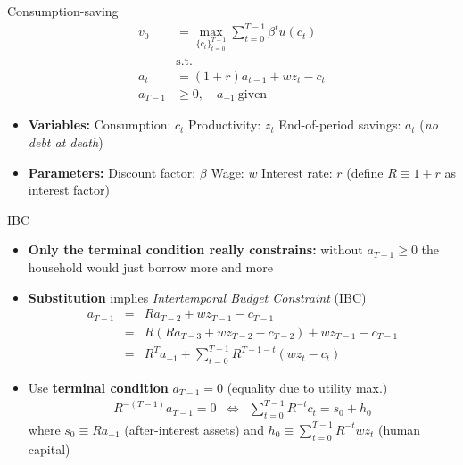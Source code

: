 \documentclass[
  10pt,
  ignorenonframetext,
  aspectratio=43,
  english,
  handout]{beamer}
\providecommand{\tightlist}{%
  \setlength{\itemsep}{0pt}\setlength{\parskip}{0pt}}
\begin{document}
\begin{frame}{Consumption-saving}
\protect{}\label{consumption-saving}
\[
\begin{aligned}
v_{0} & =\max_{\{c_{t}\}^{T-1}_{t=0}}\sum^{T-1}_{t=0}\beta^{t}u(c_{t})\\
& \text{s.t.}\\
a_{t} & =(1+r)a_{t-1}+wz_{t}-c_{t}\\
a_{T-1} & \geq0, \quad a_{-1}\  \text{given}
\end{aligned}
\]

\begin{itemize}
\item
  \textbf{Variables:} Consumption: \(c_{t}\) Productivity: \(z_{t}\)
  End-of-period savings: \(a_{t}\) (\emph{no debt at death})
\item
  \textbf{Parameters:} Discount factor: \(\beta\) Wage: \(w\) Interest
  rate: \(r\) (define \(R\equiv1+r\) as interest factor)
\end{itemize}
\end{frame}

\begin{frame}{IBC}
\protect{}\label{ibc}
\begin{itemize}
\tightlist
\item
  \textbf{Only the terminal condition really constrains:} without
  \(a_{T-1}\geq0\) the household would just borrow more and more
\item
  \textbf{Substitution} implies \emph{Intertemporal Budget Constraint}
  (IBC) \[
    \begin{aligned}
    a_{T-1} & = & Ra_{T-2}+wz_{T-1}-c_{T-1}\\
    & = & R(Ra_{T-3}+wz_{T-2}-c_{T-2})+wz_{T-1}-c_{T-1}\\
    & = & R^{T}a_{-1}+\sum^{T-1}_{t=0}R^{T-1-t}(wz_{t}-c_{t})
    \end{aligned}
    \]
\item
  Use \textbf{terminal condition} \(a_{T-1}=0\) (equality due to utility
  max.) \[
    \begin{aligned}
    R^{-(T-1)}a_{T-1}=0 & \Leftrightarrow & \sum^{T-1}_{t=0}R^{-t}c_{t}=s_{0}+h_{0}
    \end{aligned}
    \] where \(s_{0}\equiv Ra_{-1}\) (after-interest assets) and
  \(h_{0}\equiv\sum^{T-1}_{t=0}R^{-t}wz_{t}\) (human capital)
\end{itemize}
\end{frame}
\end{document}
